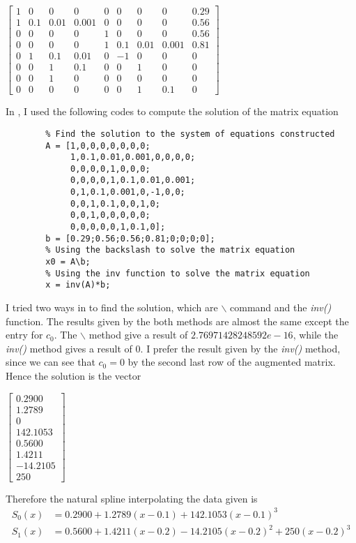 \begin{answer}
    \begin{center}
    $\left[\begin{matrix}
        1 & 0 & 0 & 0 & 0 & 0 & 0 & 0 & 0.29\\
        1 & 0.1 & 0.01 & 0.001 & 0 & 0 & 0 & 0 & 0.56\\
        0 & 0 & 0 & 0 & 1 & 0 & 0 & 0 & 0.56\\
        0 & 0 & 0 & 0 & 1 & 0.1 & 0.01 & 0.001 & 0.81\\
        0 & 1 & 0.1 & 0.01 & 0 & -1 & 0 & 0 & 0 \\
        0 & 0 & 1 & 0.1 & 0 & 0 & 1 & 0 & 0\\
        0 & 0 & 1 & 0 & 0 & 0 & 0 & 0 & 0\\
        0 & 0 & 0 & 0 & 0 & 0 & 1 & 0.1 & 0
    \end{matrix}\right]$
    \end{center}
    
    In \MATLAB, I used the following codes to compute the solution of the matrix equation
    \begin{verbatim}
        % Find the solution to the system of equations constructed
        A = [1,0,0,0,0,0,0,0;
             1,0.1,0.01,0.001,0,0,0,0;
             0,0,0,0,1,0,0,0;
             0,0,0,0,1,0.1,0.01,0.001;
             0,1,0.1,0.001,0,-1,0,0;
             0,0,1,0.1,0,0,1,0;
             0,0,1,0,0,0,0,0;
             0,0,0,0,0,1,0.1,0];
        b = [0.29;0.56;0.56;0.81;0;0;0;0];
        % Using the backslash to solve the matrix equation
        x0 = A\b;
        % Using the inv function to solve the matrix equation
        x = inv(A)*b;
    \end{verbatim}
    I tried two ways in \MATLAB to find the solution, which are $\backslash$ command and the \textit{inv()} function. The results given by the both methods are almost the same except the entry for $c_0$. The $\backslash$ method give a result of $2.76971428248592e-16$, while the \textit{inv()} method gives a result of $0$. I prefer the result given by the \textit{inv()} method, since we can see that $c_0 = 0$ by the second last row of the augmented matrix.
    Hence the solution is the vector
    \begin{center}
        $\left[\begin{matrix}
        0.2900\\
        1.2789\\
        0\\
        142.1053\\
        0.5600\\
        1.4211\\
        -14.2105\\
        250
        \end{matrix}\right]$
    \end{center}
    Therefore the natural spline interpolating the data given is
    \begin{align}
        S_0(x) &= 0.2900 + 1.2789(x-0.1) + 142.1053(x-0.1)^3\\
        S_1(x) &= 0.5600 + 1.4211(x-0.2) - 14.2105(x-0.2)^2 + 250(x-0.2)^3
    \end{align}
\end{answer}